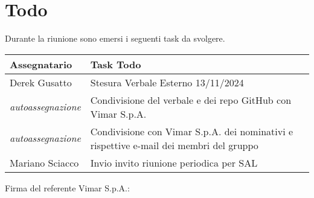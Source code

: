 \section{Todo}
Durante la riunione sono emersi i seguenti task da svolgere.

\begin{center}
  \begin{tabular}{|p{5cm}|p{8cm}|}
    \hline
    \textbf{Assegnatario}       & \textbf{Task Todo} \\ \hline
     Derek Gusatto   &  Stesura Verbale Esterno 13/11/2024\\ \hline
     \textit{autoassegnazione}  & Condivisione del verbale e dei repo GitHub con Vimar S.p.A. \\ \hline
     \textit{autoassegnazione}  & Condivisione con Vimar S.p.A. dei nominativi e rispettive e-mail dei membri del gruppo \\ \hline
     Mariano Sciacco  & Invio invito riunione periodica per SAL \\ \hline
  \end{tabular}
\end{center}
\vspace{4cm}
\noindent Firma del referente Vimar S.p.A.: \underline{\hspace{5cm}}